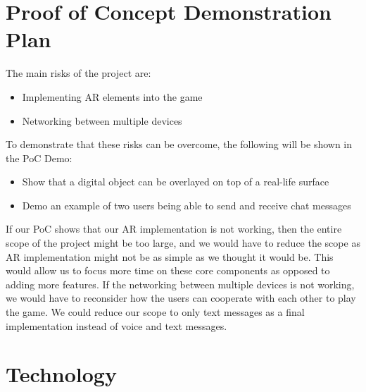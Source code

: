 \documentclass{article}
\begin{document}
\section{Proof of Concept Demonstration Plan}
The main risks of the project are:
\begin{itemize}
    \item Implementing AR elements into the game
    \item Networking between multiple devices
\end{itemize}
To demonstrate that these risks can be overcome, the following will be shown in the PoC Demo:
\begin{itemize}
    \item Show that a digital object can be overlayed on top of a real-life surface 
    \item Demo an example of two users being able to send and receive chat messages
\end{itemize}
If our PoC shows that our AR implementation is not working, then the entire scope of the project might be too large, and we would have to reduce the scope as AR implementation might not be as simple as we thought it would be. This would allow us to focus more time on these core components as opposed to adding more features.
If the networking between multiple devices is not working, we would have to reconsider how the users can cooperate with each other to play the game. We could reduce our scope to only text messages as a final implementation instead of voice and text messages. 



\section{Technology}
\end{document}
